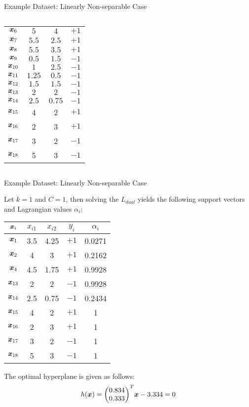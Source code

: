 \begin{frame}{Example Dataset: Linearly Non-separable Case}
\begin{columns}
\begin{center}
\begin{tabular}{|c|c|c|c|}
        ${\boldsymbol x}_6$ & $5$ & $4$ & $+1$\\
        ${\boldsymbol x}_7$ & $5.5$ & $2.5$ & $+1$\\
        ${\boldsymbol x}_8$ & $5.5$ & $3.5$ & $+1$\\
        ${\boldsymbol x}_9$ & $0.5$ & $1.5$ & $-1$\\
        ${\boldsymbol x}_{10}$ & $1$ & $2.5$ & $-1$\\
        ${\boldsymbol x}_{11}$ & $1.25$ & $0.5$ & $-1$\\
        ${\boldsymbol x}_{12}$ & $1.5$ & $1.5$ & $-1$\\
        ${\boldsymbol x}_{13}$ & $2$ & $2$ & $-1$\\
        ${\boldsymbol x}_{14}$ & $2.5$ & $0.75$ & $-1$\\
        \hline
        ${\boldsymbol x}_{15}$ & 4 & 2 & $+1$\\
        ${\boldsymbol x}_{16}$ & 2 & 3 & $+1$\\
        ${\boldsymbol x}_{17}$ & 3 & 2 & $-1$\\
        ${\boldsymbol x}_{18}$ & 5 & 3 & $-1$\\
		\hline
    \end{tabular}%
\end{center}
\end{columns}
\end{frame}


\begin{frame}{Example Dataset: Linearly Non-separable Case}

    Let $k=1$ and $C=1$, then solving the $L_{dual}$ yields the
    following support vectors and Lagrangian values
    $\alpha_i$:
    \begin{center}%
    {\renewcommand{\arraystretch}{1.1}\begin{tabular}{|c|c|c|c|c|}
        \hline
        ${\boldsymbol x}_i$ & $x_{i1}$ & $x_{i2}$ & $y_i$ & $\alpha_i$\\
        \hline
        ${\boldsymbol x}_1$ & 3.5 & 4.25 & $+1$ & 0.0271\\
        ${\boldsymbol x}_2$ & 4 & 3 & $+1$ & 0.2162\\
        ${\boldsymbol x}_4$ & 4.5 & 1.75 & $+1$ & 0.9928\\
        ${\boldsymbol x}_{13}$ & 2 & 2 & $-1$ & 0.9928\\
        ${\boldsymbol x}_{14}$ & 2.5 & 0.75 & $-1$ & 0.2434\\
        ${\boldsymbol x}_{15}$ & 4 & 2 & $+1$ & 1\\
        ${\boldsymbol x}_{16}$ & 2 & 3 & $+1$ & 1\\
        ${\boldsymbol x}_{17}$ & 3 & 2 & $-1$ & 1\\
        ${\boldsymbol x}_{18}$ & 5 & 3 & $-1$ & 1\\
        \hline
   \end{tabular}}\vspace*{6pt}
    \end{center}
The optimal hyperplane is given as follows:
\begin{align*}
    h(\bx) = \cramped{\matr{0.834\\0.333}^T} \bx - 3.334 = 0
\end{align*}
\end{frame}


